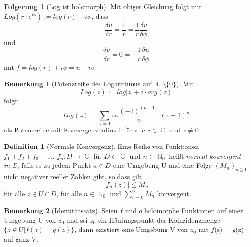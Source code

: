 \documentclass[10pt,a4paper]{article}
\theoremstyle{plain}
\theoremstyle{definition}
\newtheorem{defn}{Definition}[section]
\newtheorem*{note}{Bemerkung}
\newtheorem*{folg}{Folgerung}
\theoremstyle{remark}
\DeclareMathOperator{\C}{\mathbb{C}}
\DeclareMathOperator{\N}{\mathbb{N}}
\begin{document}
\begin{folg}[Log ist holomorph]

Mit obiger Gleichung folgt mit $Log(r\cdot e^{i \phi}) := log(r) + i \phi$, dass $$\frac{\delta u}{\delta r} =\frac{1}{r} = \frac{1}{r} \frac{\delta v}{\delta \phi} $$ und $$\frac{\delta v}{\delta r} = 0=-\frac{1}{r} \frac{\delta u}{\delta \phi}$$ mit $f = log(r) + i\phi= u +iv$.

\end{folg}

\begin{note}[Potenzreihe des Logarithmus auf $\C\setminus\{0\}$]

Mit $$Log(z) := log|z|+ i \cdot arg(z)$$ folgt: $$Log(z) = \sum_{n = 1}{\infty}\frac{(-1)^{(n-1)}}{n}(z-1)^{n}$$ als Potenzreihe mit Konvergenzradius 1 für alle $z \in \C$ und $z \neq 0$.

\end{note}

\begin{defn}[Normale Konvergenz]

Eine Reihe von Funktionen\\ $f_{1}+f_{2}+f_{3}+....$ $f_{n}: D\rightarrow \C $ für $D \subset \C$ und $n \in \N_{0}$ heißt \textit{normal konvergent in D}, falls es zu jedem Punkt $a \in D$ eine Umgebung U und eine Folge $(M_{n})_{n\geq0}$ nicht negativer reeller Zahlen gibt, so dass gilt $$|f_{n}(z)|\leq M_{n}$$ für alle $z \in U \cap D$, für alle $n \in \N_{0}$ und $\sum_{n = 0}^{\infty}M_{n}$ konvergent.

\end{defn}

\begin{note}[Identitätssatz]

Seien $f$ und $g$ holomorphe Funktionen auf einer Umgebung U von $z_{0}$ und sei $z_{0}$ ein Häufungspunkt der Koinzidenzmenge\\  $\{ z \in U  |  f(z) = g(z) \}$, dann existiert eine Umgebung V von $z_{0}$ mit $f$(z) = $g$(z) auf ganz V.

\end{note}
\end{document}
